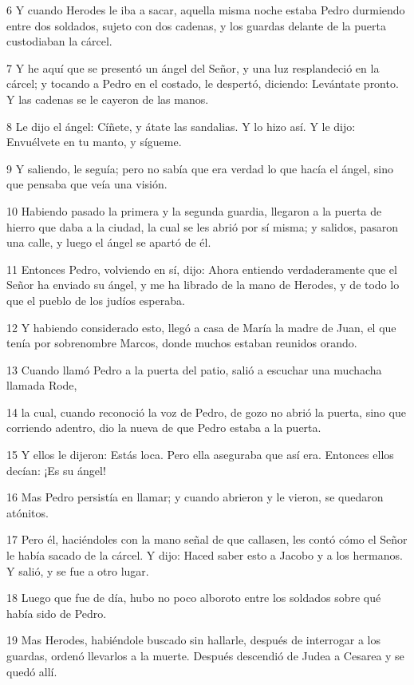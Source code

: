 \par 6 Y cuando Herodes le iba a sacar, aquella misma noche estaba Pedro durmiendo entre dos soldados, sujeto con dos cadenas, y los guardas delante de la puerta custodiaban la cárcel.
\par 7 Y he aquí que se presentó un ángel del Señor, y una luz resplandeció en la cárcel; y tocando a Pedro en el costado, le despertó, diciendo: Levántate pronto. Y las cadenas se le cayeron de las manos.
\par 8 Le dijo el ángel: Cíñete, y átate las sandalias. Y lo hizo así. Y le dijo: Envuélvete en tu manto, y sígueme.
\par 9 Y saliendo, le seguía; pero no sabía que era verdad lo que hacía el ángel, sino que pensaba que veía una visión.
\par 10 Habiendo pasado la primera y la segunda guardia, llegaron a la puerta de hierro que daba a la ciudad, la cual se les abrió por sí misma; y salidos, pasaron una calle, y luego el ángel se apartó de él.
\par 11 Entonces Pedro, volviendo en sí, dijo: Ahora entiendo verdaderamente que el Señor ha enviado su ángel, y me ha librado de la mano de Herodes, y de todo lo que el pueblo de los judíos esperaba.
\par 12 Y habiendo considerado esto, llegó a casa de María la madre de Juan, el que tenía por sobrenombre Marcos, donde muchos estaban reunidos orando.
\par 13 Cuando llamó Pedro a la puerta del patio, salió a escuchar una muchacha llamada Rode,
\par 14 la cual, cuando reconoció la voz de Pedro, de gozo no abrió la puerta, sino que corriendo adentro, dio la nueva de que Pedro estaba a la puerta.
\par 15 Y ellos le dijeron: Estás loca. Pero ella aseguraba que así era. Entonces ellos decían: ¡Es su ángel!
\par 16 Mas Pedro persistía en llamar; y cuando abrieron y le vieron, se quedaron atónitos.
\par 17 Pero él, haciéndoles con la mano señal de que callasen, les contó cómo el Señor le había sacado de la cárcel. Y dijo: Haced saber esto a Jacobo y a los hermanos. Y salió, y se fue a otro lugar.
\par 18 Luego que fue de día, hubo no poco alboroto entre los soldados sobre qué había sido de Pedro.
\par 19 Mas Herodes, habiéndole buscado sin hallarle, después de interrogar a los guardas, ordenó llevarlos a la muerte. Después descendió de Judea a Cesarea y se quedó allí.

